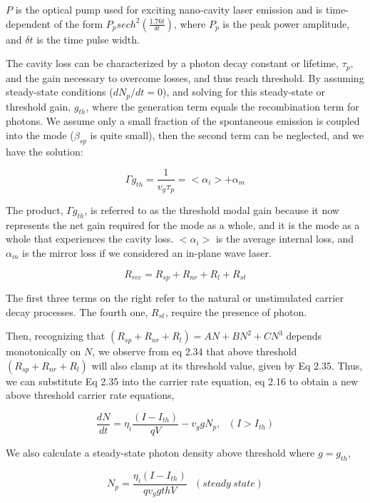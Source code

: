 $P$ is the optical pump used for exciting nano-cavity laser emission and is
time-dependent of the form $P_{p}sech^2(\frac{1.76t}{\delta{t}})$, where $P_p$ is the peak power amplitude, and $\delta{t}$ is the time pulse width.


The cavity loss can be characterized by a photon decay constant or lifetime,
$\tau_p$, and the gain necessary to overcome losses, and thus reach threshold.
By assuming steady-state conditions (\ie $dN_p/dt = 0$), and solving for this
steady-state or threshold gain, $g_{th}$, where the generation term equals the
recombination term for photons. We assume only a small fraction of the
spontaneous emission is coupled into the mode (\ie $\beta_{sp}$ is quite
small), then the second term can be neglected, and we have the solution:

\begin{equation}
  \Gamma{g_{th}} = \frac{1}{v_g\tau_p} = <\alpha_i> + \alpha_m
\end{equation}

The product, $\Gamma{g_{th}}$, is referred to as the threshold modal gain
because it now represents the net gain required for the mode as a whole, and it
is the mode as a whole that experiences the cavity loss. $<\alpha_i>$ is the
average internal loss, and $\alpha_m$ is the mirror loss if we considered an
in-plane wave laser.

\begin{equation}
  R_{rec} = R_{sp} + R_{nr} + R_{l} + R_{st}
\end{equation}

The first three terms on the right refer to the natural or unstimulated carrier
decay processes. The fourth one, $R_{st}$, require the presence of photon.


Then, recognizing that $(R_{sp} + R_{nr} + R_{l}) =AN + BN^2 +CN^3$ depends
monotonically on $N$, we observe from eq 2.34 that above threshold $(R_{sp} +
R_{nr} + R_{l})$ will also clamp at its threshold value, given by Eq 2.35. Thus,
we can substitute Eq 2.35 into the carrier rate equation, eq 2.16 to obtain a
new above threshold carrier rate equations,

\begin{equation}
  \frac{dN}{dt} = \eta_i \frac{(I - I_{th})}{qV} - v_{g}gN_p,~~~   (I > I_{th})
\end{equation}

We also calculate a steady-state photon density above threshold where $g = g_{th}$,

\begin{equation}
  N_p = \frac{\eta_i (I - I_{th})}{qv_{g}g{th}V}~~~   (steady~ state)
\end{equation}

